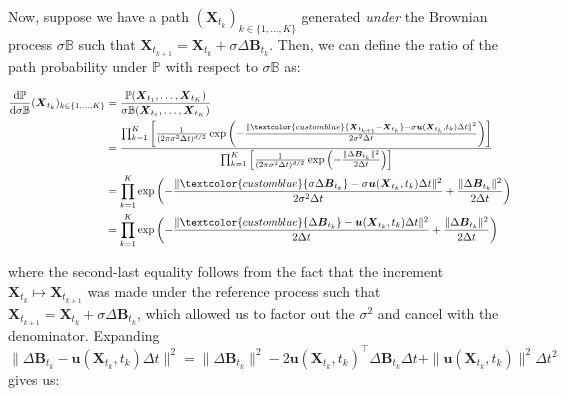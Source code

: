 \documentclass{article}
\newcommand{\bluetext}[1]{\textcolor{customblue}{#1}}
\begin{document}
Now, suppose we have a path $(\boldsymbol{X}_{t_k})_{k\in \{1, \dots, K\}}$ generated \textit{under} the Brownian process $\sigma\mathbb{B}$ such that $\boldsymbol{X}_{t_{k+1}}=\boldsymbol{X}_{t_k}+\sigma\Delta \boldsymbol{B}_{t_k}$. Then, we can define the ratio of the path probability under $\mathbb{P}$ with respect to $\sigma\mathbb{B}$ as:
\begin{small}
\begin{align}
    \frac{\mathrm{d}\mathbb{P}}{\mathrm{d}\sigma\mathbb{B}}(\boldsymbol{X}_{t_k})_{k\in \{1, \dots, K\}}&=\frac{\mathbb{P}(\boldsymbol{X}_{t_1}, \dots, \boldsymbol{X}_{t_K})}{\sigma\mathbb{B}(\boldsymbol{X}_{t_1}, \dots , \boldsymbol{X}_{t_K})}\nonumber\\
    &=\frac{\prod_{k=1}^K \left[\frac{1}{(2\pi\sigma^2\Delta t)^{d/2}}\exp\left(-\frac{\|\bluetext{\boldsymbol{X}_{t_{k+1}}-\boldsymbol{X}_{t_k}}-\sigma \boldsymbol{u}(\boldsymbol{X}_{t_k},t_k)\Delta t\|^2}{2\sigma^2\Delta t}\right)\right]}{\prod_{k=1}^K \left[\frac{1}{(2\pi\sigma^2\Delta t)^{d/2}}\exp\left(-\frac{\|\Delta \boldsymbol{B}_{t_k}\|^2}{2\Delta t}\right)\right]}\nonumber\\
    &=\prod_{k=1}^K\exp\left(-\frac{\|\bluetext{\sigma\Delta \boldsymbol{B}_{t_k}}-\sigma \boldsymbol{u}(\boldsymbol{X}_{t_k},t_k)\Delta t\|^2}{2\sigma^2\Delta t}+\frac{\|\Delta \boldsymbol{B}_{t_k}\|^2}{2\Delta t}\right)\nonumber\\
    &=\prod_{k=1}^K\exp\left(-\frac{\|\bluetext{\Delta \boldsymbol{B}_{t_k}}- \boldsymbol{u}(\boldsymbol{X}_{t_k},t_k)\Delta t\|^2}{2\Delta t}+\frac{\|\Delta \boldsymbol{B}_{t_k}\|^2}{2\Delta t}\right)
\end{align}
\end{small}
where the second-last equality follows from the fact that the increment $\boldsymbol{X}_{t_k}\mapsto \boldsymbol{X}_{t_{k+1}}$ was made under the reference process such that $\boldsymbol{X}_{t_{k+1}}=\boldsymbol{X}_{t_k}+\sigma\Delta \boldsymbol{B}_{t_k}$, which allowed us to factor out the $\sigma^2$ and cancel with the denominator. Expanding $\|\Delta \boldsymbol{B}_{t_k}- \boldsymbol{u}(\boldsymbol{X}_{t_k},t_k)\Delta t\|^2=\|\Delta \boldsymbol{B}_{t_k}\|^2-2 \boldsymbol{u}(\boldsymbol{X}_{t_k}, t_k)^\top \Delta \boldsymbol{B}_{t_k}\Delta t+\|\boldsymbol{u}(\boldsymbol{X}_{t_k}, t_k)\|^2\Delta t^2$ gives us:
\end{document}
